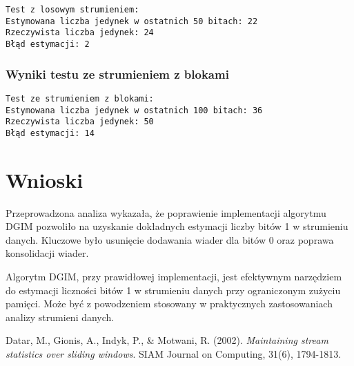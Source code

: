 \documentclass{article}
\begin{document}
\begin{verbatim}
Test z losowym strumieniem:
Estymowana liczba jedynek w ostatnich 50 bitach: 22
Rzeczywista liczba jedynek: 24
Błąd estymacji: 2
\end{verbatim}

\subsubsection{Wyniki testu ze strumieniem z blokami}

\begin{verbatim}
Test ze strumieniem z blokami:
Estymowana liczba jedynek w ostatnich 100 bitach: 36
Rzeczywista liczba jedynek: 50
Błąd estymacji: 14
\end{verbatim}

\section{Wnioski}

Przeprowadzona analiza wykazała, że poprawienie implementacji algorytmu DGIM pozwoliło na uzyskanie dokładnych estymacji liczby bitów 1 w strumieniu danych. Kluczowe było usunięcie dodawania wiader dla bitów 0 oraz poprawa konsolidacji wiader.

Algorytm DGIM, przy prawidłowej implementacji, jest efektywnym narzędziem do estymacji liczności bitów 1 w strumieniu danych przy ograniczonym zużyciu pamięci. Może być z powodzeniem stosowany w praktycznych zastosowaniach analizy strumieni danych.

\begin{thebibliography}{9}

Datar, M., Gionis, A., Indyk, P., \& Motwani, R. (2002). \textit{Maintaining stream statistics over sliding windows}. SIAM Journal on Computing, 31(6), 1794-1813.

\end{thebibliography}
\end{document}
